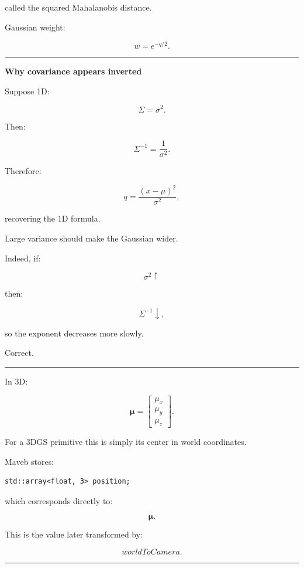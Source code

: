 called the squared Mahalanobis distance.

Gaussian weight:

\[
w=e^{-q/2}.
\]

\begin{center}\rule{0.5\linewidth}{0.5pt}\end{center}

\textbf{Why covariance appears inverted}

Suppose 1D:

\[
\Sigma=\sigma^2.
\]

Then:

\[
\Sigma^{-1}
=
\frac1{\sigma^2}.
\]

Therefore:

\[
q=
\frac{(x-\mu)^2}{\sigma^2},
\]

recovering the 1D formula.

Large variance should make the Gaussian wider.

Indeed, if:

\[
\sigma^2\uparrow
\]

then:

\[
\Sigma^{-1}\downarrow,
\]

so the exponent decreases more slowly.

Correct.

\begin{center}\rule{0.5\linewidth}{0.5pt}\end{center}

In 3D:

\[
\boxed{
\boldsymbol\mu=
\begin{bmatrix}
\mu_x\\
\mu_y\\
\mu_z
\end{bmatrix}.
}
\]

For a 3DGS primitive this is simply its center in world coordinates.

Maveb stores:

\begin{verbatim}
std::array<float, 3> position;
\end{verbatim}

which corresponds directly to:

\[
\boldsymbol\mu.
\]

This is the value later transformed by:

\[
worldToCamera.
\]

\begin{center}\rule{0.5\linewidth}{0.5pt}\end{center}

